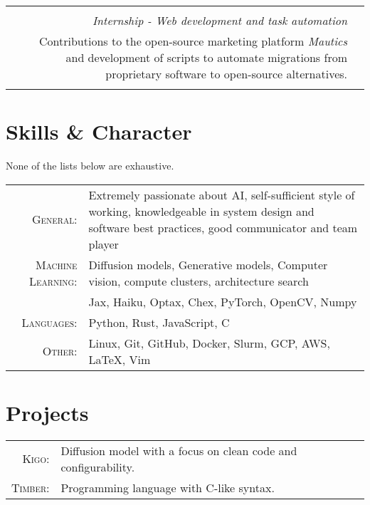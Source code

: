 \documentclass[11pt]{article}
\newcommand{\tabitem}{{\textbullet}~}
\begin{document}
\begin{tabular}{r|l}
    \begin{tabularx}{0.8\textwidth}{X}
        \textsc{Padberg \& Partners} \\

        \emph{Internship - Web development and task automation} \\

        \tabitem Contributions to the open-source marketing platform
        \textit{Mautics} and development of scripts to automate migrations from
        proprietary software to open-source alternatives. \\

    \end{tabularx}

\end{tabular}

\section{Skills \& Character}

None of the lists below are exhaustive.

\vspace{1em}

\begin{tabularx}{\textwidth}{rX}
    \textsc{General:} & Extremely passionate about AI, self-sufficient style of
    working, knowledgeable in system design and software best practices, good
    communicator and team player \\
    \textsc{Machine Learning:} & Diffusion models,
                                 Generative models,
                                 Computer vision,
                                 compute clusters,
                                 architecture search \\
                               & Jax, Haiku, Optax, Chex, PyTorch, OpenCV, Numpy \\
    \textsc{Languages:} & Python, Rust, JavaScript, C \\
    \textsc{Other:} & Linux, Git, GitHub, Docker, Slurm, GCP, AWS, LaTeX, Vim \\
\end{tabularx}

\section{Projects}

\begin{tabularx}{\textwidth}{rX}
    \textsc{Kigo:} & Diffusion model with a focus on clean code and configurability.\\
    \textsc{Timber:} & Programming language with C-like syntax.\\
\end{tabularx}
\end{document}
